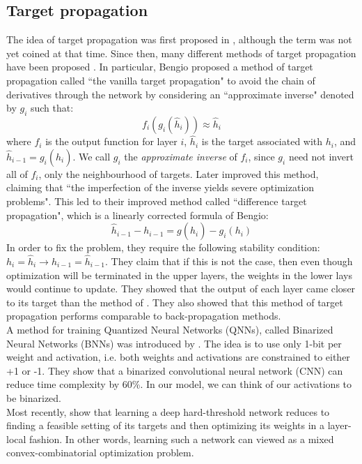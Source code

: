 \subsection{Target propagation}
The idea of target propagation was first proposed in \cite{lecun1989backpropagation}, although the term was not yet coined at that time. Since then, many different methods of target propagation have been proposed \cite{bengio1995input}\cite{courbariaux2015binaryconnect}. In particular, Bengio\cite{bengio2014auto} proposed a method of target propagation called ``the vanilla target propagation" to avoid the chain of derivatives through the network by considering an ``approximate inverse" denoted by $g_i$ such that: $$f_i(g_i(\hat{h}_i)) \approx \hat{h}_i$$ where $f_i$ is the output function for layer $i$, $\hat{h}_i$ is the target associated with $h_i$, and $\hat{h}_{i-1}=g_i(\hat{h}_i)$. We call $g_i$ the \emph{approximate inverse} of $f_i$, since $g_i$ need not invert all of $f_i$, only the neighbourhood of targets. Later \cite{hubara2016quantized} improved this method, claiming that ``the imperfection of the inverse yields severe optimization problems". This led to their improved method called ``difference target propagation", which is a linearly corrected formula of Bengio: $$\hat{h}_{i-1}-h_{i-1}=g(\hat{h}_i)-g_i(h_i)$$ In order to fix the problem, they require the following stability condition: $h_i = \hat{h}_i \rightarrow h_{i-1}=\hat{h}_{i-1}$. They claim that if this is not the case, then even though optimization will be terminated in the upper layers, the weights in the lower lays would continue to update. They showed that the output of each layer came closer to its target than the method of \cite{bengio2014auto}. They also showed that this method of target propagation performs comparable to back-propagation methods. \\

A method for training Quantized Neural Networks (QNNs), called Binarized Neural Networks (BNNs) was introduced by \cite{hubara2016quantized}. The idea is to use only 1-bit per weight and activation, i.e. both weights and activations are constrained to either +1 or -1. They show that a binarized convolutional neural network (CNN) can reduce time complexity by 60\%. In our model, we can think of our activations to be binarized.\\ 

Most recently, \cite{friesen2017deep} show that learning a deep hard-threshold network reduces to finding a feasible setting of its targets and then optimizing its weights in a layer-local fashion. In other words, learning such a network can viewed as a mixed convex-combinatorial optimization problem.

